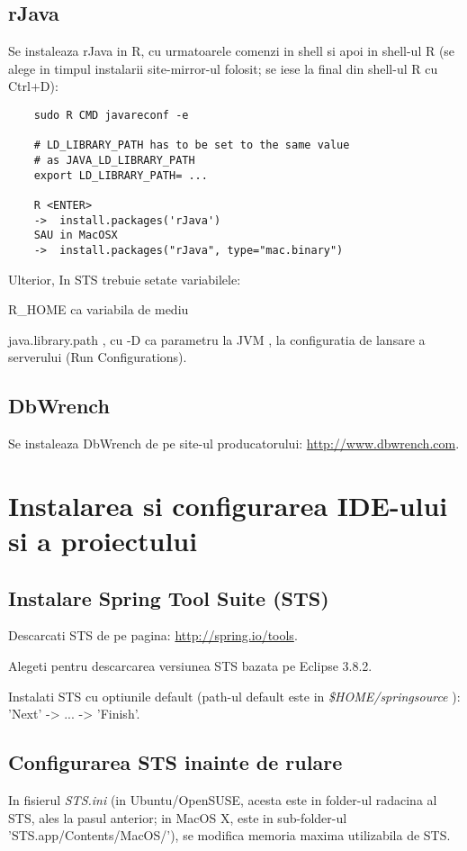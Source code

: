 \subsection{rJava}
Se instaleaza rJava in R, cu urmatoarele comenzi in shell si apoi in shell-ul R
(se alege in timpul instalarii site-mirror-ul folosit;
se iese la final din shell-ul R cu Ctrl+D):
\begin{lstlisting}
	sudo R CMD javareconf -e
	
	# LD_LIBRARY_PATH has to be set to the same value 
	# as JAVA_LD_LIBRARY_PATH 
	export LD_LIBRARY_PATH= ...

	R <ENTER>
	->	install.packages('rJava')
	SAU in MacOSX	
	->	install.packages("rJava", type="mac.binary")
\end{lstlisting}

Ulterior, In STS trebuie setate variabilele:

R_HOME ca variabila de mediu

java.library.path , cu -D ca parametru la JVM , la configuratia de lansare a serverului (Run Configurations).


\subsection{DbWrench}
Se instaleaza DbWrench de pe site-ul producatorului:
\url{http://www.dbwrench.com}.

\section{Instalarea si configurarea IDE-ului si a proiectului}

\subsection{Instalare Spring Tool Suite (STS)}
Descarcati STS de pe pagina:
\url{http://spring.io/tools}.

Alegeti pentru descarcarea versiunea STS bazata pe Eclipse 3.8.2.

Instalati STS cu optiunile default (path-ul default este in \emph{\$HOME/springsource} ):
'Next' -> ... -> 'Finish'.

\subsection{Configurarea STS inainte de rulare}
In fisierul \emph{STS.ini} (in Ubuntu/OpenSUSE, acesta este in folder-ul
radacina al STS, ales la pasul anterior; in MacOS X, este in sub-folder-ul
'STS.app/Contents/MacOS/'), se modifica memoria maxima utilizabila de STS.

